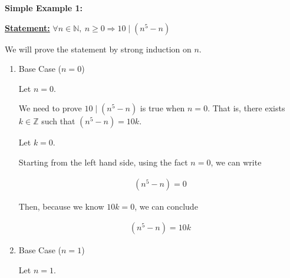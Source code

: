 \documentclass[12pt]{article}
\begin{document}
\begin{itemize}
\begin{itemize}
\begin{itemize}
            \begin{mdframed}
                \textbf{Simple Example 1:}

                \bigskip

                \underline{\textbf{Statement:}} $\forall n \in \mathbb{N},\:n \geq 0 \Rightarrow 10 \mid (n^5 - n)$

                \bigskip

                We will prove the statement by strong induction on $n$.

                \begin{enumerate}[1.]
                    \item Base Case ($n = 0$)

                    \begin{mdframed}

                    Let $n = 0$.

                    \bigskip

                    We need to prove $10 \mid (n^5 - n)$ is true when $n = 0$. That is,
                    there exists $k \in \mathbb{Z}$ such that $(n^5 - n) = 10k$.

                    \bigskip

                    Let $k = 0$.

                    \bigskip

                    Starting from the left hand side, using the fact $n = 0$,
                    we can write

                    \begin{align}
                        (n^5 - n) = 0
                    \end{align}

                    \bigskip

                    Then, because we know $10k = 0$, we can conclude

                    \begin{align}
                        (n^5 - n) = 10k
                    \end{align}

                    \end{mdframed}

                    \item Base Case ($n = 1$)

                    \begin{mdframed}

                    Let $n = 1$.


\end{mdframed}
\end{enumerate}
\end{mdframed}
\end{itemize}
\end{itemize}
\end{itemize}
\end{document}
